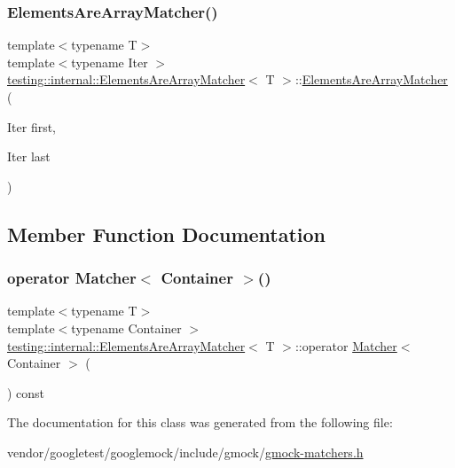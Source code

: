 \subsubsection{\texorpdfstring{Elements\+Are\+Array\+Matcher()}{ElementsAreArrayMatcher()}}
{\footnotesize\ttfamily template$<$typename T$>$ \\
template$<$typename Iter $>$ \\
\hyperlink{classtesting_1_1internal_1_1_elements_are_array_matcher}{testing\+::internal\+::\+Elements\+Are\+Array\+Matcher}$<$ T $>$\+::\hyperlink{classtesting_1_1internal_1_1_elements_are_array_matcher}{Elements\+Are\+Array\+Matcher} (\begin{DoxyParamCaption}\item[{Iter}]{first,  }\item[{Iter}]{last }\end{DoxyParamCaption})\hspace{0.3cm}{\ttfamily [inline]}}



\subsection{Member Function Documentation}
\mbox{\label{classtesting_1_1internal_1_1_elements_are_array_matcher_ac776db6072208f39f3eced25fb353f75}} 
\subsubsection{\texorpdfstring{operator Matcher$<$ Container $>$()}{operator Matcher< Container >()}}
{\footnotesize\ttfamily template$<$typename T$>$ \\
template$<$typename Container $>$ \\
\hyperlink{classtesting_1_1internal_1_1_elements_are_array_matcher}{testing\+::internal\+::\+Elements\+Are\+Array\+Matcher}$<$ T $>$\+::operator \hyperlink{classtesting_1_1_matcher}{Matcher}$<$ Container $>$ (\begin{DoxyParamCaption}{ }\end{DoxyParamCaption}) const\hspace{0.3cm}{\ttfamily [inline]}}



The documentation for this class was generated from the following file\+:\begin{DoxyCompactItemize}
\item 
vendor/googletest/googlemock/include/gmock/\hyperlink{gmock-matchers_8h}{gmock-\/matchers.\+h}\end{DoxyCompactItemize}
